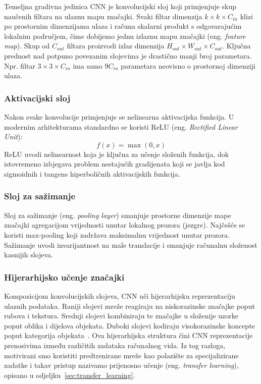 \documentclass[diplomskirad]{fer}
\begin{document}
Temeljna gradivna jedinica CNN je konvolucijski sloj koji primjenjuje skup naučenih filtara na ulaznu mapu značajki. Svaki filtar dimenzija $k \times k \times C_{in}$ klizi po prostornim dimenzijama ulaza i računa skalarni produkt s odgovarajućim lokalnim područjem, čime dobijemo jednu izlaznu mapu značajki (eng. \textit{feature map}). Skup od $C_{out}$ filtara proizvodi izlaz dimenzija $H_{out} \times W_{out} \times C_{out}$. Ključna prednost nad potpuno povezanim slojevima je drastično manji broj parametara. Npr. filtar $3 \times 3 \times C_{in}$ ima samo $9 C_{in}$ parametara neovisno o prostornoj dimenziji ulaza.

\subsubsection{Aktivacijski sloj}

Nakon svake konvolucije primjenjuje se nelinearna aktivacijska funkcija. U modernim arhitekturama standardno se koristi ReLU (eng. \textit{Rectified Linear Unit}):
\begin{equation}
	f(x) = \max(0, x)
\end{equation}
ReLU uvodi nelinearnost koja je ključna za učenje složenih funkcija, dok istovremeno izbjegava problem nestajućih gradijenata koji se javlja kod sigmoidnih i tangens hiperboličnih aktivacijskih funkcija.

\subsubsection{Sloj za sažimanje}

Sloj za sažimanje (eng. \textit{pooling layer}) smanjuje prostorne dimenzije mape značajki agregacijom vrijednosti unutar lokalnog prozora (jezgre). Najčešće se koristi max-pooling koji zadržava maksimalnu vrijednost unutar prozora. Sažimanje uvodi invarijantnost na male translacije i smanjuje računalnu složenost kasnijih slojeva.

\subsubsection{Hijerarhijsko učenje značajki}

Kompozicijom konvolucijskih slojeva, CNN uči hijerarhijsku reprezentaciju ulaznih podataka. Raniji slojevi mreže reagiraju na niskorazinske značajke poput rubova i tekstura. Srednji slojevi kombiniraju te značajke u složenije uzorke poput oblika i dijelova objekata. Duboki slojevi kodiraju visokorazinske koncepte poput kategorija objekata~\cite{goodfellow2016deep}. Ova hijerarhijska struktura čini CNN reprezentacije prenosivima između različitih zadataka računalnog vida. Iz tog razloga, motivirani smo koristiti predtrenirane mreže kao polazište za specijalizirane zadatke i takav pristup nazivamo prijenosno učenje (eng. \textit{transfer learning}), opisano u odjeljku~\ref{sec:transfer_learning}.
\end{document}
